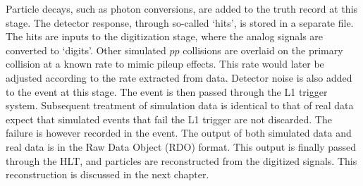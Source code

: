 \par Particle decays, such as photon conversions, are added to the truth record 
at this stage. The detector response, through so-called `hits', is stored in a separate file.   
The hits are inputs to the digitization stage, where the analog signals are converted to 
`digits'. Other simulated $pp$ collisions are overlaid on the primary collision at 
a known rate to mimic pileup effects. This rate would later be adjusted according to the rate 
extracted from data. Detector noise is also added to the event at this stage.  
The event is then passed through the L1 trigger system. Subsequent treatment of simulation data is identical 
to that of real data expect that simulated events that fail the L1 trigger are 
not discarded. The failure is however recorded in the event. 
The output of both simulated data and real data is in the Raw Data Object (RDO) format. This output is 
finally passed through the HLT, and particles are reconstructed from the digitized signals. 
This reconstruction is discussed in the next chapter.  

